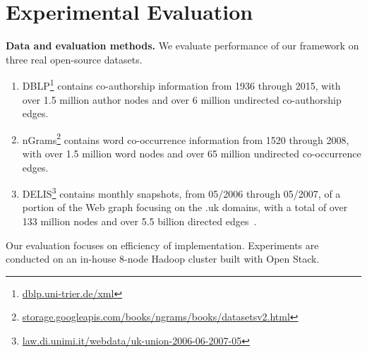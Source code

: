 \section{Experimental Evaluation}
\label{sec:exp}

{\bf Data and evaluation methods.}  We evaluate performance of our
framework on three real open-source datasets.  

\begin{enumerate}

\item DBLP\footnote{\url{dblp.uni-trier.de/xml}} contains co-authorship
  information from 1936 through 2015, with over 1.5 million author
  nodes and over 6 million undirected co-authorship edges.  

\item nGrams\footnote{\url{storage.googleapis.com/books/ngrams/books/datasetsv2.html}}
  contains word co-occurrence information from 1520 through 2008, with
  over 1.5 million word nodes and over 65 million undirected
  co-occurrence edges.

\item
  DELIS\footnote{\url{law.di.unimi.it/webdata/uk-union-2006-06-2007-05}}
  contains monthly snapshots, from 05/2006 through 05/2007, of a
  portion of the Web graph focusing on the .uk domains, with a total
  of over 133 million nodes and over 5.5 billion directed
  edges~\cite{BSVLTAG}.

\end{enumerate}

Our evaluation focuses on efficiency of implementation. Experiments
are conducted on an in-house 8-node Hadoop cluster built with Open
Stack. 
